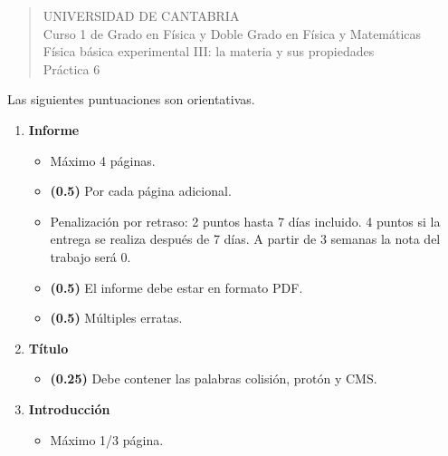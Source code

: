 \documentclass[11pt]{articulo}
\begin{document}
\begin{verse}
{\Large UNIVERSIDAD DE CANTABRIA}\\ 
\vspace*{0.5cm}
{\normalsize \rm Curso 1 de Grado en F\'isica y Doble Grado en F\'isica y Matem\'aticas}\\
{\normalsize \rm F\'isica b\'asica experimental III: la materia y sus propiedades}\\ 
{\normalsize \rm Pr\'actica 6}\\
\end{verse} 

\vspace*{0.25cm}

Las siguientes puntuaciones son orientativas.

\begin{enumerate}

\item {\bf Informe}

\begin{itemize}

\item M\'aximo 4 p\'aginas.

\item {\bf (0.5)} Por cada p\'agina adicional.

\item Penalizaci\'on por retraso: 2 puntos hasta 7 d\'ias incluido. 4 puntos si la entrega se realiza despu\'es de 7 d\'ias. A partir de 3 semanas la nota del trabajo ser\'a 0.

\item {\bf (0.5)} El informe debe estar en formato PDF.

\item {\bf (0.5)} M\'ultiples erratas.

\end{itemize}

\item {\bf T\'itulo}

\begin{itemize}

\item {\bf (0.25)} Debe contener las palabras colisi\'on, prot\'on y CMS.

\end{itemize}

\item {\bf Introducci\'on}

\begin{itemize}

\item M\'aximo 1/3 p\'agina.


\end{itemize}
\end{enumerate}
\end{document}
